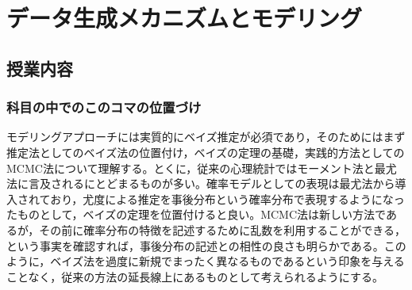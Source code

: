 \section{データ生成メカニズムとモデリング}
\subsection{授業内容}
\subsubsection{科目の中でのこのコマの位置づけ}
モデリングアプローチには実質的にベイズ推定が必須であり，そのためにはまず推定法としてのベイズ法の位置付け，ベイズの定理の基礎，実践的方法としてのMCMC法について理解する。とくに，従来の心理統計ではモーメント法と最尤法に言及されるにとどまるものが多い。確率モデルとしての表現は最尤法から導入されており，尤度による推定を事後分布という確率分布で表現するようになったものとして，ベイズの定理を位置付けると良い。MCMC法は新しい方法であるが，その前に確率分布の特徴を記述するために乱数を利用することができる，という事実を確認すれば，事後分布の記述との相性の良さも明らかである。このように，ベイズ法を過度に新規でまったく異なるものであるという印象を与えることなく，従来の方法の延長線上にあるものとして考えられるようにする。

